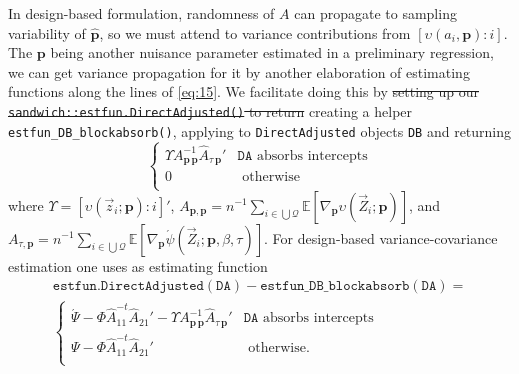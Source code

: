 \documentclass{article}
\newcommand{\absorbInterceptsEF}{\upsilon}
\newcommand{\AbsorbInterceptsEF}{\Upsilon}
\begin{document}
In design-based formulation, randomness of $A$ can propagate to
sampling variability of $\hat{\mathbf{p}}$,  so we must attend to
variance contributions from $[\absorbInterceptsEF(a_{i}, \mathbf{p}): i]$. 
The $\mathbf{p}$ being another nuisance parameter estimated in a
preliminary regression, we can get variance propagation for it by
another elaboration of estimating functions along the lines of
\eqref{eq:15}. We facilitate doing
this by \st{setting up our
\texttt{sandwich::estfun.DirectAdjusted()} to return} creating a
helper \texttt{estfun\_DB\_blockabsorb()}, applying to
\texttt{DirectAdjusted} objects \texttt{DB} and returning
\begin{equation*}
\begin{cases}
  \AbsorbInterceptsEF{}
  A_{\mathbf{p}\,\mathbf{p}}^{-1}\hat{A}_{\tau\,\mathbf{p}}' &
  \mathtt{DA} \text{ absorbs intercepts}\\
0 & \text{ otherwise}\\
\end{cases}
\end{equation*}
where 
$\AbsorbInterceptsEF= [\absorbInterceptsEF(\vec{z}_{i}; \mathbf{p}): i]'$, 
$A_{\mathbf{p}, \mathbf{p}} = n^{-1}\sum_{i\in \bigcup
  \mathcal{Q}}\mathbb{E} [\nabla_{\mathbf{p}}\absorbInterceptsEF(\vec{Z}_{i};
\mathbf{p})]$, and $A_{\tau, \mathbf{p}} = n^{-1} \sum_{i\in \bigcup
  \mathcal{Q}}\mathbb{E}[\nabla_{\mathbf{p}}\acute{\psi}(\vec{Z}_{i};
\mathbf{p}, \beta, \tau)]$.  For design-based variance-covariance
estimation one uses as estimating function
\begin{multline*}
  \mathtt{estfun.DirectAdjusted(DA)} -
  \mathtt{estfun\_DB\_blockabsorb(DA)} =\\
\begin{cases}
\acute{\Psi} -
  \Phi
  \hat{A}_{11}^{-t}\hat{A}_{21}'  - \AbsorbInterceptsEF{}
  A_{\mathbf{p}\,\mathbf{p}}^{-1}\hat{A}_{\tau\,\mathbf{p}}' & \mathtt{DA} \text{ absorbs intercepts}\\
 \Psi -
  \Phi
  \hat{A}_{11}^{-t}\hat{A}_{21}' 
 & \text{ otherwise}.\\
\end{cases}
\end{multline*}
\end{document}

